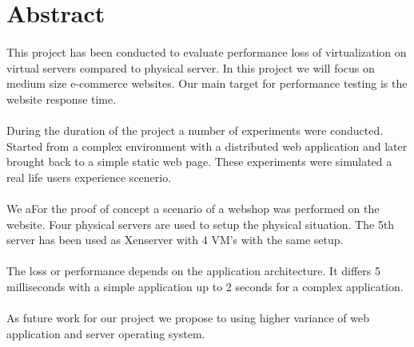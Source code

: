\section*{Abstract}
\paragraph{}
This project has been conducted to evaluate performance loss of virtualization on virtual servers compared to physical server. In this project we will focus on medium size e-commerce websites. Our main target for performance testing is the website response time.   

\paragraph{}
During the duration of the project a number of experiments were conducted. Started from a complex environment with a distributed web application and later brought back to a simple static web page. These experiments were simulated a real life users experience scenerio. 
\paragraph{}
We aFor the proof of concept a scenario of a webshop was performed on the website. Four physical servers are used to setup the physical situation. The 5th server has been used as Xenserver with 4 VM's with the same setup. 
\paragraph{}
The loss or performance depends on the application architecture. It differs 5 milliseconds with a simple application up to 2 seconds for a complex application.
\paragraph{}
As future work for our project we propose to using higher variance of web application and server operating system.